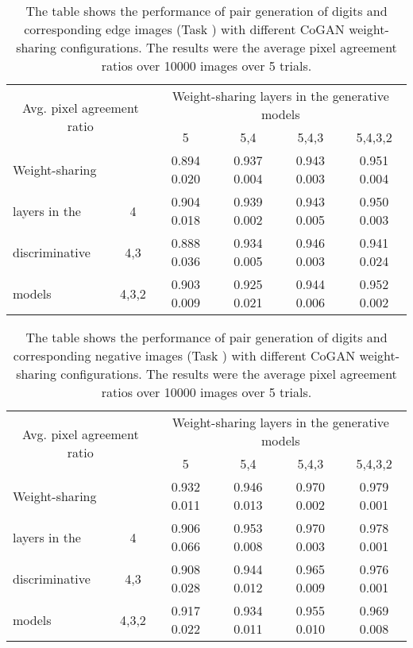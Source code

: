 \documentclass{article}
\begin{document}
\begin{table}[thb!]
\centering
{
\caption{The table shows the performance of pair generation of digits and corresponding edge images (Task ) with different CoGAN weight-sharing configurations. The results were the average pixel agreement ratios over 10000 images over 5 trials.}
\label{tbl::weight_sharing_analysis_A} 
\begin{tabular}{lc|cccc}
\hline
\multicolumn{2}{c|}{\multirow{2}{*}{Avg. pixel agreement ratio}} & \multicolumn{4}{c}{Weight-sharing layers in the generative models}\\
\multicolumn{2}{c|}{}   & 5 & 5,4 & 5,4,3 & 5,4,3,2\\
\hline
Weight-sharing &       & 0.894  0.020	& 0.937  0.004 &	0.943  0.003 &	0.951  0.004 \\
layers in the  & 4     & 0.904 	0.018 & 0.939  0.002 &	0.943  0.005 &	0.950  0.003 \\
discriminative & 4,3   & 0.888 	0.036 & 0.934  0.005 &	0.946  0.003 &	0.941  0.024 \\
models         & 4,3,2 & 0.903  0.009 &	0.925  0.021 &	0.944  0.006 &	0.952  0.002 \\
\hline
\end{tabular}}
\end{table}

\begin{table}[thb!]
\centering
{
\caption{The table shows the performance of pair generation of digits and corresponding negative images (Task ) with different CoGAN weight-sharing configurations. The results were the average pixel agreement ratios over 10000 images over 5 trials.}
\label{tbl::weight_sharing_analysis_B} 
\begin{tabular}{lc|cccc}
\hline
\multicolumn{2}{c|}{\multirow{2}{*}{Avg. pixel agreement ratio}} & \multicolumn{4}{c}{Weight-sharing layers in the generative models}\\
\multicolumn{2}{c|}{}   & 5 & 5,4 & 5,4,3 & 5,4,3,2\\
\hline
Weight-sharing &       & 0.932  0.011 & 0.946  0.013 &	0.970  0.002 &	0.979  0.001 \\
layers in the  & 4     & 0.906  0.066 & 0.953  0.008 &	0.970  0.003 &	0.978  0.001 \\
discriminative & 4,3   & 0.908  0.028 & 0.944  0.012 &	0.965  0.009 &	0.976  0.001 \\
models         & 4,3,2 & 0.917  0.022 & 0.934  0.011 &	0.955  0.010 & 0.969  0.008 \\
\hline
\end{tabular}}
\end{table}
\end{document}
